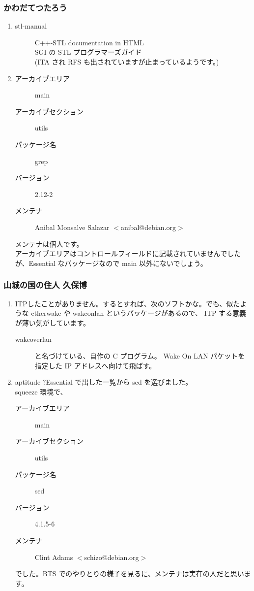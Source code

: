 \documentclass[cjk,dvipdfmx,10pt,%
hyperref={bookmarks=true,bookmarksnumbered=true,bookmarksopen=false,%
colorlinks=false,%
pdftitle={第 59 回 関西 Debian 勉強会},%
pdfauthor={倉敷・のがた・かわだ・佐々木},%
pdfsubject={資料},%
}]{beamer}
\begin{document}
\begin{frame}
    \frametitle{ かわだてつたろう }
  \begin{enumerate}
  \item
    \begin{description}
    \item [stl-manual] C++-STL documentation in HTML\\
      SGI の STL プログラマーズガイド\\
      (ITA され RFS も出されていますが止まっているようです。)
    \end{description}
  \item 
    \begin{description}
    \item [アーカイブエリア] main
    \item [アーカイブセクション] utils 
    \item [パッケージ名] grep
    \item [バージョン] 2.12-2
    \item [メンテナ] Anibal Monsalve Salazar $<$anibal@debian.org$>$
    \end{description}
    メンテナは個人です。\\
    アーカイブエリアはコントロールフィールドに記載されていませんでしたが、Essential なパッケージなので main 以外にないでしょう。
  \end{enumerate}
\end{frame}

\begin{frame}
  \frametitle{ 山城の国の住人 久保博 }
  \begin{enumerate}
  \item ITPしたことがありません。するとすれば、次のソフトかな。でも、似たような etherwake や wakeonlan というパッケージがあるので、 ITP する意義が薄い気がしています。
    \begin{description}
    \item [wakeoverlan] と名づけている、自作の C プログラム。 Wake On LAN パケットを指定した IP アドレスへ向けて飛ばす。
    \end{description}
  \item aptitude ?Essential で出した一覧から sed を選びました。\\
    squeeze 環境で、
    \begin{description}
    \item [アーカイブエリア] main
    \item [アーカイブセクション] utils
    \item [パッケージ名] sed
    \item [バージョン] 4.1.5-6
    \item [メンテナ] Clint Adams $<$schizo@debian.org$>$
    \end{description}
    でした。BTS でのやりとりの様子を見るに、メンテナは実在の人だと思います。
  \end{enumerate}
\end{frame}
\end{document}
